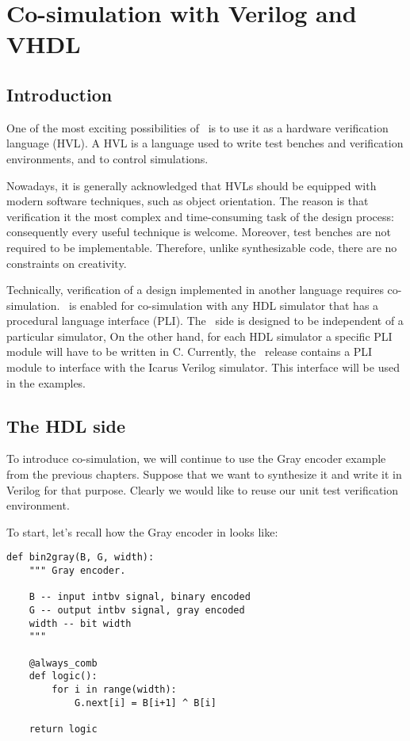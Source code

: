 \chapter{Co-simulation with Verilog and VHDL \label{cosim}}

\section{Introduction \label{cosim-intro}}

One of the most exciting possibilities of \myhdl\
is to use it as a hardware verification language (HVL).
A HVL is a language used to write test benches and
verification environments, and to control simulations.

Nowadays, it is generally acknowledged that HVLs should be equipped
with modern software techniques, such as object orientation. The
reason is that verification it the most complex and time-consuming
task of the design process: consequently every useful technique is
welcome. Moreover, test benches are not required to be
implementable. Therefore, unlike synthesizable code, there
are no constraints on creativity.

Technically, verification of a design implemented in
another language requires co-simulation. \myhdl\ is 
enabled for co-simulation with any HDL simulator that
has a procedural language interface (PLI). The \myhdl\
side is designed to be independent of a particular
simulator, On the other hand, for each HDL simulator a specific
PLI module will have to be written in C. Currently,
the \myhdl\ release contains a PLI module to interface
with the Icarus Verilog simulator. This interface will
be used in the examples.

\section{The HDL side \label{cosim-hdl}}

To introduce co-simulation, we will continue to use the Gray encoder
example from the previous chapters. Suppose that we want to
synthesize it and write it in Verilog for that purpose. Clearly we would
like to reuse our unit test verification environment. 

To start, let's recall how the Gray encoder in \myhdl{} looks like:

\begin{verbatim}
def bin2gray(B, G, width):
    """ Gray encoder.

    B -- input intbv signal, binary encoded
    G -- output intbv signal, gray encoded
    width -- bit width
    """

    @always_comb
    def logic():
        for i in range(width):
            G.next[i] = B[i+1] ^ B[i]

    return logic
\end{verbatim}

